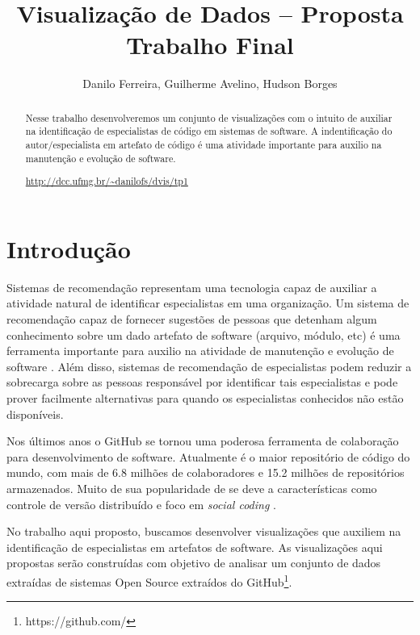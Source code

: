 \documentclass[12pt]{article}
\title{Visualização de Dados -- Proposta Trabalho Final}
\author{Danilo Ferreira, Guilherme Avelino, Hudson Borges}  %
\begin{document}
\maketitle

\begin{abstract}
Nesse trabalho desenvolveremos um conjunto de visualizações com o intuito de auxiliar na identificação de especialistas de código em sistemas de software. A indentificação do autor/especialista em artefato de código é uma atividade importante   para auxilio na manutenção e evolução de software.\\
\centerline{\url{http://dcc.ufmg.br/~danilofs/dvis/tp1}}
\end{abstract}


\section{Introdução}
Sistemas de recomendação representam uma tecnologia capaz de auxiliar a atividade natural de identificar especialistas em uma organização. Um sistema de recomendação capaz de fornecer sugestões de pessoas que detenham algum conhecimento sobre um dado artefato de software (arquivo, módulo, etc) é uma ferramenta importante para auxilio na atividade de manutenção e evolução de software \cite{McDonald2000}. Além disso, sistemas de recomendação de especialistas podem reduzir a sobrecarga sobre as pessoas responsável por identificar tais especialistas e pode prover facilmente alternativas para quando os especialistas conhecidos não estão disponíveis.

Nos últimos anos o GitHub se tornou uma poderosa ferramenta de colaboração para desenvolvimento de software. Atualmente é o maior repositório de código do mundo, com mais de 6.8 milhões de colaboradores e 15.2 milhões de repositórios armazenados. Muito de sua popularidade de se deve a características como controle de versão distribuído e foco em \textit{social coding} \cite{Dabbish2012}. 

No trabalho aqui proposto, buscamos desenvolver visualizações que auxiliem na identificação de especialistas em artefatos de software. As visualizações aqui propostas serão construídas com objetivo de analisar um conjunto de dados extraídas de sistemas Open Source extraídos do GitHub\footnote{https://github.com/}.
\end{document}

